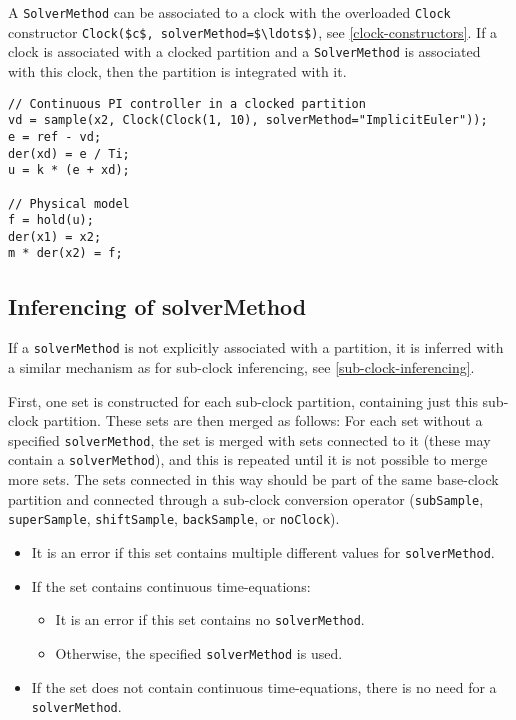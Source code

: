A \lstinline!SolverMethod! can be associated to a clock with the overloaded \lstinline!Clock! constructor \lstinline!Clock($c$, solverMethod=$\ldots$)!, see \cref{clock-constructors}.
If a clock is associated with a clocked partition and a \lstinline!SolverMethod! is associated with this clock, then the partition is integrated with it.

\begin{example}
\begin{lstlisting}[language=modelica]
// Continuous PI controller in a clocked partition
vd = sample(x2, Clock(Clock(1, 10), solverMethod="ImplicitEuler"));
e = ref - vd;
der(xd) = e / Ti;
u = k * (e + xd);

// Physical model
f = hold(u);
der(x1) = x2;
m * der(x2) = f;
\end{lstlisting}
\end{example}

\subsection{Inferencing of solverMethod}\label{inferencing-of-solvermethod}

If a \lstinline!solverMethod! is not explicitly associated with a partition, it is inferred with a similar mechanism as for sub-clock inferencing, see \cref{sub-clock-inferencing}.

First, one set is constructed for each sub-clock partition, containing just this sub-clock partition.
These sets are then merged as follows:
For each set without a specified \lstinline!solverMethod!, the set is merged with sets connected to it (these may contain a \lstinline!solverMethod!), and this is repeated until it is not possible to merge more sets.
The sets connected in this way should be part of the same base-clock partition and connected through a sub-clock conversion operator (\lstinline!subSample!, \lstinline!superSample!, \lstinline!shiftSample!, \lstinline!backSample!, or \lstinline!noClock!).

\begin{itemize}
\item It is an error if this set contains multiple different values for \lstinline!solverMethod!.
\item If the set contains continuous time-equations:
\begin{itemize}
\item It is an error if this set contains no \lstinline!solverMethod!.
\item Otherwise, the specified \lstinline!solverMethod! is used.
\end{itemize}
\item If the set does not contain continuous time-equations, there is no need for a \lstinline!solverMethod!.
\end{itemize}

